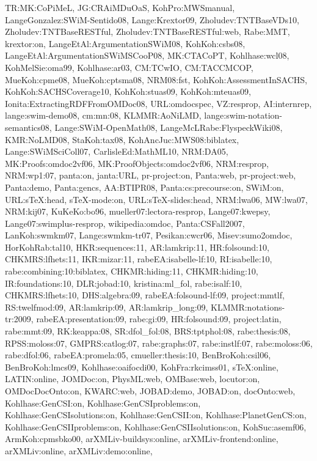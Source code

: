 {TR:MK:CoPiMeL,%
JG:CRAiMDuOaS,%
KohPro:MWSmanual,%
LangeGonzalez:SWiM-Sentido08,%
Lange:Krextor09,%
Zholudev:TNTBaseVDs10,%
Zholudev:TNTBaseRESTful,%
Zholudev:TNTBaseRESTful:web,%
Rabe:MMT,%
krextor:on,%
LangeEtAl:ArgumentationSWiM08,%
KohKoh:csbs08,%
LangeEtAl:ArgumentationSWiMSCooP08,%
MK:CTACoPT,%
Kohlhase:wcl08,%
KohMelSie:oma99,%
Kohlhase:ar03,%
CM:TCwIO,%
CM:TACCMCOP,%
MueKoh:cpme08,%
MueKoh:cptsma08,%
NRM08:fst,%
KohKoh:AssessmentInSACHS,%
KohKoh:SACHSCoverage10,%
KohKoh:stuas09,%
KohKoh:mteuas09,%
Ionita:ExtractingRDFFromOMDoc08,%
URL:omdocspec,%
VZ:resprop,%
AI:internrep,%
lange:swim-demo08,%
cm:mn:08,%
KLMMR:AoNiLMD,%
lange:swim-notation-semantics08,%
Lange:SWiM-OpenMath08,%
LangeMcLRabe:FlyspeckWiki08,%
KMR:NoLMD08,%
StaKoh:tax08,%
KohAncJuc:MWS08:biblatex,%
Lange:SWiMSciColl07,%
CarlisleEd:MathML10,%
NRM:DA05,%
MK:Proofs:omdoc2vf06,%
MK:ProofObjects:omdoc2vf06,%
NRM:resprop,%
NRM:wp1:07,%
panta:on,%
janta:URL,%
pr-project:on,%
Panta:web,%
pr-project:web,%
Panta:demo,%
Panta:gencs,%
AA:BTIPR08,%
Panta:cs:precourse:on,%
SWiM:on,%
URL:sTeX:head,%
sTeX-mode:on,%
URL:sTeX-slides:head,%
NRM:lwa06,%
MW:lwa07,%
NRM:kij07,%
KuKeKo:bo96,%
mueller07:lectora-resprop,%
Lange07:kwepsy,%
Lange07:swimplus-resprop,%
wikipedia:omdoc,%
Panta:CSFall2007,%
LanKoh:swmkm07,%
Lange:swmkm-tr07,%
Pesikan:cwcr06,%
Misev:sumo2omdoc,%
HorKohRab:tal10,%
HKR:sequences:11,%
AR:lamkrip:11,%
HR:folsound:10,%
CHKMRS:lfhets:11,%
IKR:mizar:11,%
rabeEA:isabelle-lf:10,%
RI:isabelle:10,%
rabe:combining:10:biblatex,%
CHKMR:hiding:11,%
CHKMR:hiding:10,%
IR:foundations:10,%
DLR:jobad:10,%
kristina:ml_fol,%
rabe:isalf:10,%
CHKMRS:lfhets:10,%
DHS:algebra:09,%
rabeEA:folsound-lf:09,%
project:mmtlf,%
RS:twelfmod:09,%
AR:lamkrip:09,%
AR:lamkrip_long:09,%
KLMMR:notations-tr:2009,%
rabeEA:presentation:09,%
rabe:gi:09,%
HR:folsound:09,%
project:latin,%
rabe:mmt:09,%
RK:keappa:08,%
SR:dfol_fol:08,%
BRS:tptphol:08,%
rabe:thesis:08,%
RPSS:moloss:07,%
GMPRS:catlog:07,%
rabe:graphs:07,%
rabe:instlf:07,%
rabe:moloss:06,%
rabe:dfol:06,%
rabeEA:promela:05,%
cmueller:thesis:10,%
BenBroKoh:csil06,%
BenBroKoh:lmcs09,%
Kohlhase:oaifocdi00,%
KohFra:rkcimss01,%
sTeX:online,%
LATIN:online,%
JOMDoc:on,%
PhysML:web,%
OMBase:web,%
locutor:on,%
OMDocDocOnto:on,%
KWARC:web,%
JOBAD:demo,%
JOBAD:on,%
docOnto:web,%
Kohlhase:GenCSI:on,%
Kohlhase:GenCSIproblems:on,%
Kohlhase:GenCSIsolutions:on,%
Kohlhase:GenCSII:on,%
Kohlhase:PlanetGenCS:on,%
Kohlhase:GenCSIIproblems:on,%
Kohlhase:GenCSIIsolutions:on,%
KohSuc:asemf06,%
ArmKoh:cpmsbko00,%
arXMLiv-buildsys:online,%
arXMLiv-frontend:online,%
arXMLiv:online,%
arXMLiv:demo:online,%
}

